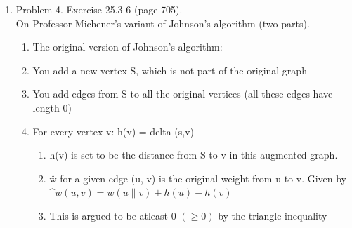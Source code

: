 \documentclass[11pt]{article}
\begin{document}
\begin{enumerate}
\item Problem 4. Exercise 25.3-6 (page 705).\\
On Professor Michener's variant of Johnson's algorithm (two parts).
\begin{enumerate}
    \item The original version of Johnson's algorithm:
    \item You add a new vertex S, which is not part of the original graph
    \item You add edges from S to all the original vertices (all these edges have length 0)
    \item For every vertex v: h(v) = delta (s,v)
    \begin{enumerate}
        \item h(v) is set to be the distance from S to v in this augmented graph.
        \item \^w for a given edge (u, v) is the original weight from u to v. Given by $\^w(u,v) = w(u\|v) + h(u)-h(v)$
        \item This is argued to be atleast 0 $(\geq 0)$ by the triangle inequality

\end{enumerate}
\end{enumerate}
\end{enumerate}
\end{document}
